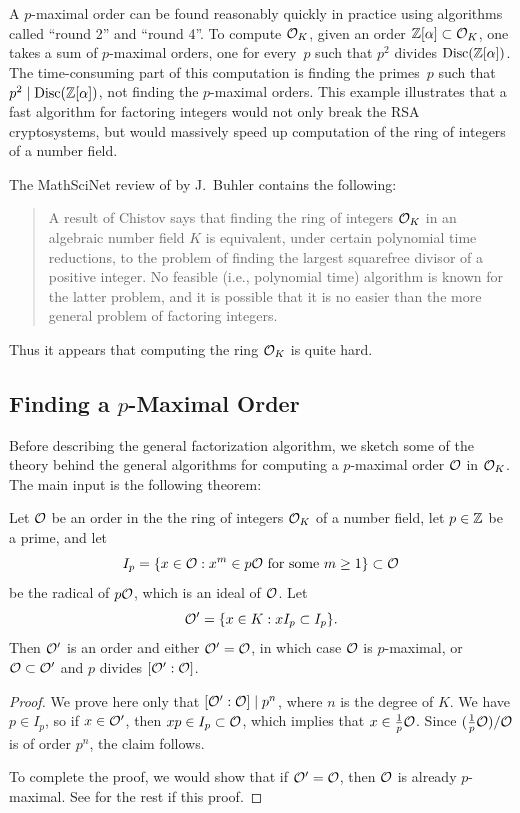 A $p$-maximal order can be found reasonably quickly in practice using
algorithms called ``round 2'' and ``round 4''.  To
compute $\mathcal{O}_K$, given an order $\mathbb{Z}[\alpha]\subset \mathcal{O}_K$, one takes a
sum of $p$-maximal orders, one for every~$p$ such that $p^2$ divides
$\operatorname{Disc}(\mathbb{Z}[\alpha])$.  The time-consuming part of this computation is 
finding the primes~$p$ such that $p^2\mid \operatorname{Disc}(\mathbb{Z}[\alpha])$, not
finding the $p$-maximal orders.  This example illustrates that
a fast algorithm for factoring integers would not only break the RSA
cryptosystems, but would massively speed up computation of the ring of
integers of a number field.
\begin{remark}
The MathSciNet review of \cite{buchmann_lenstra:approx} by
J.~Buhler contains the following:
\begin{quote}
    A result of Chistov says that finding the ring of integers $\mathcal{O}_K$
    in an algebraic number field $K$ is equivalent, under certain
    polynomial time reductions, to the problem of finding the largest
    squarefree divisor of a positive integer. No feasible (i.e.,
    polynomial time) algorithm is known for the latter problem, and it
    is possible that it is no easier than the more general problem of
    factoring integers.
\end{quote}
Thus it appears that computing the ring $\mathcal{O}_K$ is quite hard. 
\end{remark}

\subsection{Finding a $p$-Maximal Order}\label{sec:alg_pmax}
Before describing the general factorization algorithm, we sketch some
of the theory behind the general algorithms for computing a
$p$-maximal order $\mathcal{O}$ in $\mathcal{O}_K$.  The main input is the following
theorem:
\begin{theorem}
Let $\mathcal{O}$ be an order in the the ring of integers $\mathcal{O}_K$ of a number field, let $p\in\mathbb{Z}$ be a prime,
and let 
$$I_p = \{x \in \mathcal{O} : x^m \in p\mathcal{O} \text{ for some $m\geq 1$}\} \subset \mathcal{O}$$ 
be the radical of $p\mathcal{O}$, which is an ideal of $\mathcal{O}$.
Let
$$
  \mathcal{O}' = \{x \in K : xI_p \subset I_p\}.
$$
Then $\mathcal{O}'$ is an order and either $\mathcal{O}'=\mathcal{O}$, in which case $\mathcal{O}$ is
$p$-maximal, or $\mathcal{O}\subset\mathcal{O}'$ and $p$ divides $[\mathcal{O}':\mathcal{O}]$.
\end{theorem}
\begin{proof}
  We prove here only that $[\mathcal{O}':\mathcal{O}] \mid p^n$, where $n$ is the degree
  of $K$.  We have $p\in I_p$, so if $x \in \mathcal{O}'$, then $xp \in
  I_p\subset \mathcal{O}$, which implies that $x\in \frac{1}{p}\mathcal{O}$.  Since
  $(\frac{1}{p}\mathcal{O})/\mathcal{O}$ is of order $p^n$, the claim follows.

To complete the proof, we would show that if $\mathcal{O}' = \mathcal{O}$, then $\mathcal{O}$ is
already $p$-maximal.  See \cite[\S6.1.1]{cohen:course_ant} for the
rest if this proof.
\end{proof}

